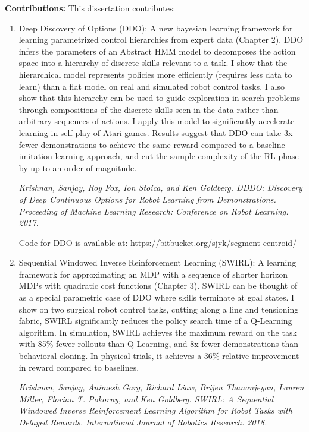 \vspace{0.75em} \noindent \textbf{Contributions: }  This dissertation contributes:

\begin{enumerate}
    \item Deep Discovery of Options (DDO): A new bayesian learning framework for learning parametrized control hierarchies from expert data (Chapter 2). DDO infers the parameters of an Abstract HMM model to decomposes the action space into a hierarchy of discrete skills relevant to a task. I show that the hierarchical model represents policies more efficiently (requires less data to learn) than a flat model on real and simulated robot control tasks. I also show that this hierarchy can be used to guide exploration in search problems through compositions of the discrete skills seen in the data rather than arbitrary sequences of actions. I apply this model to significantly accelerate learning in self-play of Atari games. Results suggest that DDO can take 3x fewer demonstrations to achieve the same reward compared to a baseline imitation learning approach, and cut the sample-complexity of the RL phase by up-to an order of magnitude.

    \emph{Krishnan, Sanjay, Roy Fox, Ion Stoica, and Ken Goldberg. DDDO: Discovery of Deep Continuous Options for Robot Learning from Demonstrations. Proceeding of Machine Learning Research: Conference on Robot Learning. 2017.} 

    Code for DDO is available at: \url{https://bitbucket.org/sjyk/segment-centroid/}
    
    \item Sequential Windowed Inverse Reinforcement Learning (SWIRL): A learning framework for approximating an MDP with a sequence of shorter horizon MDPs with quadratic cost functions (Chapter 3). SWIRL can be thought of as a special parametric case of DDO where skills terminate at goal states. I show on two surgical robot control tasks, cutting along a line and tensioning fabric, SWIRL significantly reduces the policy search time of a Q-Learning algorithm. In simulation, SWIRL achieves the maximum reward on the task with 85\% fewer rollouts than Q-Learning, and 8x fewer demonstrations than behavioral cloning. In physical trials, it achieves a 36\%  relative improvement in reward compared to baselines. 

    \emph{Krishnan, Sanjay, Animesh Garg, Richard Liaw, Brijen Thananjeyan, Lauren Miller, Florian T. Pokorny, and Ken Goldberg. SWIRL: A Sequential Windowed Inverse Reinforcement Learning Algorithm for Robot Tasks with Delayed Rewards. International Journal of Robotics Research. 2018.}


\end{enumerate}
